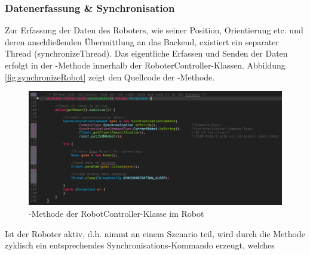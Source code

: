 \subsubsection{Datenerfassung \& Synchronisation}\label{robotdatenerfassung}
Zur Erfassung der Daten des Roboters, wie seiner Position, Orientierung etc. und deren anschließenden Übermittlung an das Backend, 
existiert ein separater Thread (synchronizeThread). Das eigentliche Erfassen und Senden der Daten erfolgt in der 
-Methode innerhalb der RoboterController-Klassen.
Abbildung \eqref{fig:synchronizeRobot} zeigt den Quellcode der -Methode.
\begin{figure}[ht]
	\centering
	\includegraphics[width=1.0\textwidth]{images/implementation/synchronizeMethod.png}
	\caption{-Methode der RobotController-Klasse im Robot}
	\label{fig:synchronizeRobot}
\end{figure}
\newline
Ist der Roboter aktiv, d.h. nimmt an einem Szenario teil, wird durch die Methode zyklisch ein entsprechendes Synchronisations-Kommando erzeugt, welches
